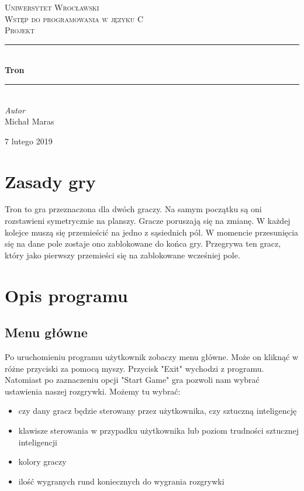 \documentclass[11pt]{article}
\begin{document}

	\begin{titlepage}
		\newcommand{\HRule}{\rule{\linewidth}{0.5mm}}
		\center

		\textsc{\LARGE Uniwersytet Wrocławski}\\[1.5cm]
		\textsc{\Large Wstęp do programowania w języku C}\\[0.5cm]
		\textsc{\large Projekt}\\[0.5cm]

		\HRule\\[0.4cm]
		{\huge\bfseries Tron}\\[0.4cm]
		\HRule\\[1.5cm]

		\large
		\textit{Autor}\\
		Michał Maras

		\vfill\vfill\vfill\vfill

		{\large 7 lutego 2019}

	\end{titlepage}

	\newpage
	
	\section{Zasady gry}
		Tron to gra przeznaczona dla dwóch graczy. Na samym początku są oni rozstawieni symetrycznie na planszy. Gracze poruszają się na zmianę. W każdej kolejce muszą się przemieścić na jedno z sąsiednich pól. W momencie przesunięcia się na dane pole zostaje ono zablokowane do końca gry. Przegrywa ten gracz, który jako pierwszy przemieści się na zablokowane wcześniej pole.
	
	\section{Opis programu}

		\subsection{Menu główne}
		Po uruchomieniu programu użytkownik zobaczy menu główne. Może on kliknąć w różne przyciski za pomocą myszy.
		\noindent Przycisk "Exit" wychodzi z programu. Natomiast po zaznaczeniu opcji "Start Game" gra pozwoli nam wybrać ustawienia naszej rozgrywki. Możemy tu wybrać:
		\begin{itemize}
  			\item czy dany gracz będzie sterowany przez użytkownika, czy sztuczną inteligencję
  			\item klawisze sterowania w przypadku użytkownika lub poziom trudności sztucznej inteligencji
 			\item kolory graczy
 			\item ilość wygranych rund koniecznych do wygrania rozgrywki
		\end{itemize}
\end{document}

